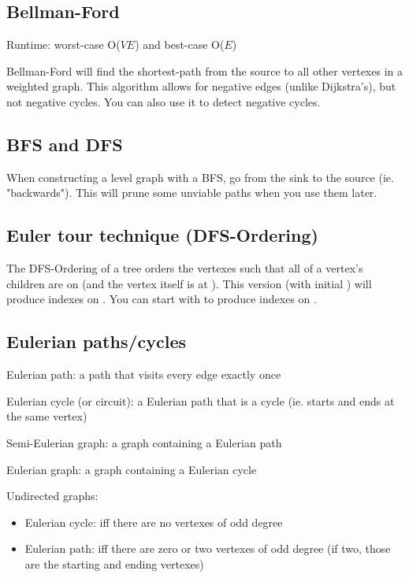 
\subsection*{Bellman-Ford}

Runtime: worst-case O($VE$) and best-case O($E$)

Bellman-Ford will find the shortest-path from the source to all other vertexes in a weighted graph. This algorithm allows for negative edges (unlike Dijkstra's), but not negative cycles. You can also use it to detect negative cycles.



\subsection*{BFS and DFS}

When constructing a level graph with a BFS, go from the sink to the source (ie. "backwards"). This will prune some unviable paths when you use them later.

\subsection*{Euler tour technique (DFS-Ordering)}

The DFS-Ordering of a tree orders the vertexes such that all of a vertex's children are on  (and the vertex itself is at ). This version (with initial ) will produce indexes on \inline{[0, numVertexes-1]}. You can start with  to produce indexes on \inline{[1, numVertexes]}.



\subsection*{Eulerian paths/cycles}

Eulerian path: a path that visits every edge exactly once

Eulerian cycle (or circuit): a Eulerian path that is a cycle (ie. starts and ends at the same vertex)

Semi-Eulerian graph: a graph containing a Eulerian path

Eulerian graph: a graph containing a Eulerian cycle

Undirected graphs: 
\begin{itemize}
    \item Eulerian cycle: iff there are no vertexes of odd degree
    \item Eulerian path: iff there are zero or two vertexes of odd degree (if two, those are the starting and ending vertexes)
\end{itemize}

